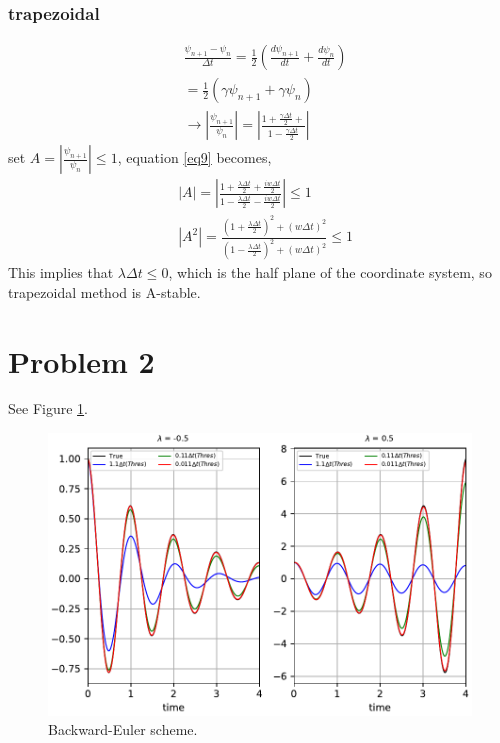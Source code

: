 \documentclass[12pt]{article}%
\begin{document}
\subsubsection{trapezoidal}

\begin{equation} \label{eq9}
\begin{split}
&\frac{\psi_{n+1} - \psi_{n}}{\Delta t}  = \frac{1}{2}(\frac{d\psi_{n+1}}{dt} + \frac{d\psi_{n}}{dt}) \\
& = \frac{1}{2}(\gamma\psi_{n+1} + \gamma\psi_{n})\\
& \rightarrow |\frac{\psi_{n+1}}{\psi_{n}}| = |\frac{1 + \frac{\gamma \Delta t}{2} + }{1 - \frac{\gamma \Delta t}{2}}| 
\end{split}
\end{equation}
set $A =  |\frac{\psi_{n+1}}{\psi_{n}}| \leq 1$,
equation \ref{eq9} becomes,
\begin{equation} \label{eq10}
\begin{split}
&|A| = |\frac{1+\frac{\lambda \Delta t}{2} + \frac{iw\Delta t}{2}}{1 - \frac{\lambda \Delta t}{2} -\frac{iw\Delta t}{2}}| \leq 1 \\
& |A^{2}| = \frac{(1 + \frac{\lambda \Delta t}{2})^{2} + (w\Delta t)^{2}}{(1 - \frac{\lambda \Delta t}{2})^{2} + (w\Delta t)^{2}} \leq 1
\end{split}
\end{equation}
This implies that $\lambda\Delta t \leq 0$, which is the half plane of the coordinate system, so trapezoidal method is A-stable.

\section{Problem 2}
See Figure \ref{fig:fig1}.
\begin{figure}
    \centering
    \includegraphics{figs/backward.pdf}
    \caption{Backward-Euler scheme.}
    \label{fig:fig1}
\end{figure}
\end{document}
